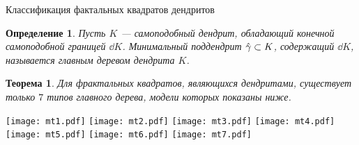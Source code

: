 \documentclass[aspectratio=1610, 10pt, notheorems]{beamer}
\newtheorem{theorem}     {Теорема}
\newtheorem{definition}  {Определение}
\begin{document}
\begin{frame}{Классификация фактальных квадратов дендритов}
\begin{definition}
Пусть $K$ --- самоподобный дендрит, обладающий конечной самоподобной границей $\dd K$. 
Минимальный поддендрит $\hat\gamma\subset K$, содержащий $\dd K$, называется {\em главным деревом} дендрита $K$.
\end{definition}
\begin{theorem}\label{thm:tree_classes}
Для фрактальных квадратов, являющихся дендритами, существует только $7$ типов главного дерева, модели которых показаны ниже.
\end{theorem}
\texttt{[image: mt1.pdf]}
\hfill
\texttt{[image: mt2.pdf]}
\hfill
\texttt{[image: mt3.pdf]}
\hfill
\texttt{[image: mt4.pdf]}\\
\texttt{[image: mt5.pdf]}
\hfill
\texttt{[image: mt6.pdf]}
\hfill
\texttt{[image: mt7.pdf]}
\end{frame}
\end{document}
